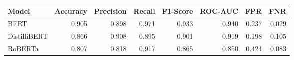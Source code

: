 \begin{tabular}{|l||r|r|r|r|r|r|r|}
\toprule
Model & \textbf{Accuracy} & \textbf{Precision} & Recall & \textbf{F1-Score} & \textbf{ROC-AUC} & \textbf{FPR} & FNR \\
\midrule \midrule
BERT & 0.905 & 0.898 & 0.971 & 0.933 & 0.940 & 0.237 & 0.029 \\
DistilliBERT & 0.866 & 0.908 & 0.895 & 0.901 & 0.919 & 0.198 & 0.105 \\
RoBERTa & 0.807 & 0.818 & 0.917 & 0.865 & 0.850 & 0.424 & 0.083 \\
\bottomrule
\end{tabular}
